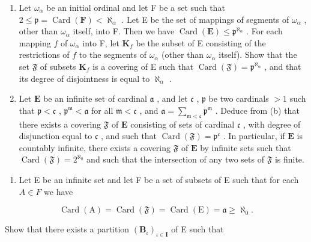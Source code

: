 \begin{enumerate}
\def\labelenumi{(\alph{enumi})}
\setcounter{enumi}{1}
\item
  Let \(\omega_{\alpha}\) be an initial ordinal and let F be a set such that \(2 \leqslant \mathfrak{p} = \operatorname{Card}(\mathbf{F}) < \aleph_{\alpha}\) . Let E be the set of mappings of segments of \(\omega_{\alpha}\) , other than \(\omega_{\alpha}\) itself, into F. Then we have \(\operatorname{Card}(\mathbf{E}) \leqslant \mathfrak{p}^{\aleph_{\alpha}}\) . For each mapping \(f\) of \(\omega_{\alpha}\) into F, let \(\mathbf{K}_f\) be the subset of E consisting of the restrictions of \(f\) to the segments of \(\omega_{\alpha}\) (other than \(\omega_{\alpha}\) itself). Show that the set \(\mathfrak{F}\) of subsets \(\mathbf{K}_f\) is a covering of E such that \(\operatorname{Card}(\mathfrak{F}) = \mathfrak{p}^{\aleph_{\alpha}}\) , and that its degree of disjointness is equal to \(\aleph_{\alpha}\) .
\item
  Let \(\mathbf{E}\) be an infinite set of cardinal \(\mathfrak{a}\) , and let \(\mathfrak{c}\) , \(\mathfrak{p}\) be two cardinals \(> 1\) such that \(\mathfrak{p} < \mathfrak{c}\) , \(\mathfrak{p}^{\mathfrak{m}} < \mathfrak{a}\) for all \(\mathfrak{m} < \mathfrak{c}\) , and \(\mathfrak{a} = \sum_{\mathfrak{m} < \mathfrak{c}} \mathfrak{p}^{\mathfrak{m}}\) . Deduce from (b) that there exists a covering \(\mathfrak{F}\) of \(\mathbf{E}\) consisting of sets of cardinal \(\mathfrak{c}\) , with degree of disjunction equal to \(\mathfrak{c}\) , and such that \(\operatorname{Card}(\mathfrak{F}) = \mathfrak{p}^{\mathfrak{c}}\) . In particular, if \(\mathbf{E}\) is countably infinite, there exists a covering \(\mathfrak{F}\) of \(\mathbf{E}\) by infinite sets such that \(\operatorname{Card}(\mathfrak{F}) = 2^{\aleph_0}\) and such that the intersection of any two sets of \(\mathfrak{F}\) is finite.
\end{enumerate}

\begin{enumerate}
\def\labelenumi{\arabic{enumi}.}
\setcounter{enumi}{25}
\tightlist
\item
  Let E be an infinite set and let F be a set of subsets of E such that for each \(A \in F\) we have
\end{enumerate}

\[
\operatorname{Card} (\mathrm{A}) = \operatorname{Card} (\mathfrak {F}) = \operatorname{Card} (\mathrm{E}) = \mathfrak {a} \geqslant \aleph_ {0}.
\]

Show that there exists a partition \((\mathbf{B}_{\iota})_{\iota\in\mathbf{I}}\) of E such that


